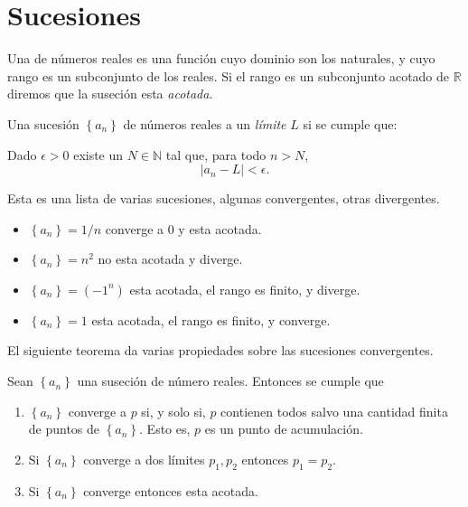 \chapter{Sucesiones}

Una  de números reales es una función cuyo dominio son los naturales,
y cuyo rango es un subconjunto de los reales. Si el rango es un subconjunto acotado
de $\mathbb{R}$ diremos que la suseción esta \emph{acotada}.

\begin{defi}
\normalmarginpar{}
	Una sucesión $\left\{ a_{n} \right\}$ de números reales  a un \emph{límite} $L$ si se cumple que:

	Dado $\epsilon>0$ existe un $N\in\mathbb{N}$ tal que, para todo $n>N$,
	\[
		\left\lvert a_{n}-L \right\rvert<\epsilon.
	\]
\end{defi}

\begin{ejem} Esta es una lista de varias sucesiones, algunas convergentes, otras divergentes.
	\begin{itemize}
		\item $\left\{ a_{n} \right\}=1/n$ converge a $0$ y esta acotada.
		\item $\left\{ a_{n} \right\}=n^2$ no esta acotada y diverge.
		\item $\left\{ a_{n} \right\}=(-1^n)$ esta acotada, el rango es finito, y diverge.
		\item $\left\{ a_{n} \right\}=1$ esta acotada, el rango es finito, y converge.
	\end{itemize}	
\end{ejem}

El siguiente teorema da varias propiedades sobre las sucesiones convergentes.

\begin{teo}
	Sean $\left\{ a_{n} \right\}$ una suseción de número reales. Entonces se cumple que
	\begin{enumerate}
		\item $\left\{ a_{n} \right\}$ converge a $p$ si, y solo si,
			$p$ contienen todos salvo una cantidad finita de puntos de $\left\{ a_{n} \right\}$.
			Esto es, $p$ es un punto de acumulación.
		\item Si $\left\{ a_{n} \right\}$ converge a dos límites $p_1,p_2$ entonces $p_1=p_{2}$.
		\item Si $\left\{ a_{n} \right\}$ converge entonces esta acotada.
	\end{enumerate}
\end{teo}

